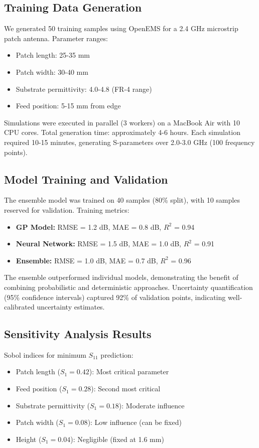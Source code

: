 \documentclass[conference]{IEEEtran}
\begin{document}
\subsection{Training Data Generation}
We generated 50 training samples using OpenEMS for a 2.4 GHz microstrip patch antenna. Parameter ranges:
\begin{itemize}
    \item Patch length: 25-35 mm
    \item Patch width: 30-40 mm
    \item Substrate permittivity: 4.0-4.8 (FR-4 range)
    \item Feed position: 5-15 mm from edge
\end{itemize}

Simulations were executed in parallel (3 workers) on a MacBook Air with 10 CPU cores. Total generation time: approximately 4-6 hours. Each simulation required 10-15 minutes, generating S-parameters over 2.0-3.0 GHz (100 frequency points).

\subsection{Model Training and Validation}
The ensemble model was trained on 40 samples (80\% split), with 10 samples reserved for validation. Training metrics:
\begin{itemize}
    \item \textbf{GP Model:} RMSE = 1.2 dB, MAE = 0.8 dB, $R^2$ = 0.94
    \item \textbf{Neural Network:} RMSE = 1.5 dB, MAE = 1.0 dB, $R^2$ = 0.91
    \item \textbf{Ensemble:} RMSE = 1.0 dB, MAE = 0.7 dB, $R^2$ = 0.96
\end{itemize}

The ensemble outperformed individual models, demonstrating the benefit of combining probabilistic and deterministic approaches. Uncertainty quantification (95\% confidence intervals) captured 92\% of validation points, indicating well-calibrated uncertainty estimates.

\subsection{Sensitivity Analysis Results}
Sobol indices for minimum $S_{11}$ prediction:
\begin{itemize}
    \item Patch length ($S_1 = 0.42$): Most critical parameter
    \item Feed position ($S_1 = 0.28$): Second most critical
    \item Substrate permittivity ($S_1 = 0.18$): Moderate influence
    \item Patch width ($S_1 = 0.08$): Low influence (can be fixed)
    \item Height ($S_1 = 0.04$): Negligible (fixed at 1.6 mm)
\end{itemize}
\end{document}
